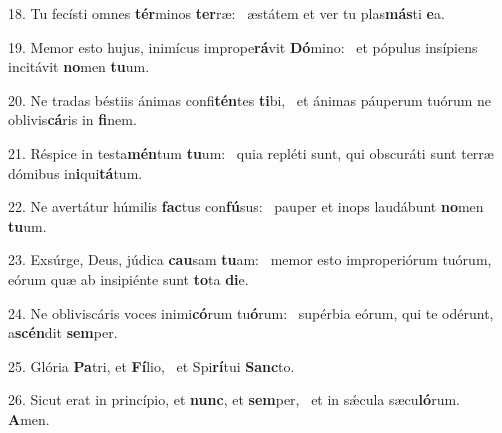18. Tu fecísti omnes \textbf{tér}minos \textbf{ter}ræ: \ast\  æstátem et ver tu plas\textbf{más}ti \textbf{e}a.\

19. Memor esto hujus, inimícus imprope\textbf{rá}vit \textbf{Dó}mino: \ast\  et pópulus insípiens incitávit \textbf{no}men \textbf{tu}um.\

20. Ne tradas béstiis ánimas confi\textbf{tén}tes \textbf{ti}bi, \ast\  et ánimas páuperum tuórum ne oblivis\textbf{cá}ris in \textbf{fi}nem.\

21. Réspice in testa\textbf{mén}tum \textbf{tu}um: \ast\  quia repléti sunt, qui obscuráti sunt terræ dómibus in\textbf{i}qui\textbf{tá}tum.\

22. Ne avertátur húmilis \textbf{fac}tus con\textbf{fú}sus: \ast\  pauper et inops laudábunt \textbf{no}men \textbf{tu}um.\

23. Exsúrge, Deus, júdica \textbf{cau}sam \textbf{tu}am: \ast\  memor esto improperiórum tuórum, eórum quæ ab insipiénte sunt \textbf{to}ta \textbf{di}e.\

24. Ne obliviscáris voces inimi\textbf{có}rum tu\textbf{ó}rum: \ast\  supérbia eórum, qui te odérunt, a\textbf{scén}dit \textbf{sem}per.\

25. Glória \textbf{Pa}tri, et \textbf{Fí}lio, \ast\  et Spi\textbf{rí}tui \textbf{Sanc}to.\

26. Sicut erat in princípio, et \textbf{nunc}, et \textbf{sem}per, \ast\  et in sǽcula sæcu\textbf{ló}rum. \textbf{A}men.\

